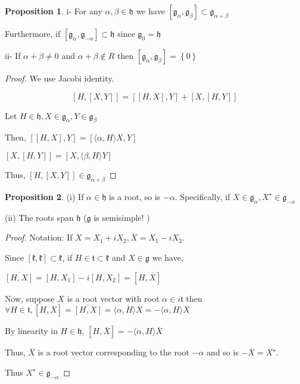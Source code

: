 \documentclass{article}
\theoremstyle{definition}
\newtheorem{proposition}{Proposition}
\begin{document}
\begin{proposition}
    i- For any \(\alpha ,\beta \in \mathfrak{h} \) we have \([\mathfrak{g}_\alpha , \mathfrak{g}_\beta] \subset \mathfrak{g}_{\alpha + \beta} \) 

    Furthermore, if \([\mathfrak{g}_\alpha ,\mathfrak{g}_{-\alpha }  ] \subset \mathfrak{h} \) since \(\mathfrak{g}_0 = \mathfrak{h}  \)  

    ii- If \(\alpha +\beta \neq 0\) and \(\alpha +\beta \notin R\) then \([\mathfrak{g}_\alpha ,\mathfrak{g}_\beta   ]= \left\{ 0 \right\} \)  

\end{proposition}

\begin{proof}
    We use Jacobi identity.

    \[
        [H,[X,Y]] = [[H,X],Y]+[X,[H,Y]]
    \]

    Let \(H\in \mathfrak{h},X\in \mathfrak{g}_\alpha , Y\in \mathfrak{g}_\beta   \) 

    Then, \([[H,X],Y]= [\langle \alpha ,H \rangle X, Y] \) 

    \([X,[H,Y]]=[X,\langle \beta ,H \rangle Y ]\) 

    Thus, \([H,[X,Y]]\in \mathfrak{g_{\alpha +\beta }} \) 

\end{proof}

\begin{proposition}
    (i) If \(\alpha \in \mathfrak{h} \) is a root, so is \(-\alpha \). Specifically, if \(X\in \mathfrak{g}_{\alpha }, X^{\star} \in \mathfrak{g}_{-\alpha }  \)
    
    (ii) The roots span \(\mathfrak{h} \) (\(\mathfrak{g} \) is semisimple! ) 
    
\end{proposition}

\begin{proof}
    Notation: If \(X=X_1+iX_2,\overline{X}=X_1 -iX_2 \).
    
    Since \([\mathfrak{k},\mathfrak{k}  ]\subset \mathfrak{k} \), if \(H\in \mathfrak{t} \subset \mathfrak{k}  \) and \(X\in \mathfrak{g} \) we have,
    
    \(\overline{[H,X]} = [H,X_1] - i[H,X_2] = [H,\overline{X} ] \) 

    Now, suppose \(X\) is a root vector with root \(\alpha \in i \mathfrak{t} \) then \(\forall H\in \mathfrak{t}, [H,\overline{X} ] = \overline{[H,X]}=\overline{\langle \alpha , H \rangle X } = -\langle \alpha ,H \rangle \overline{X}  \) 

    By linearity in \(H\in \mathfrak{h} \), \([H,\overline{X} ]=-\langle \alpha ,H \rangle \overline{X}  \)  

    Thus, \(\overline{X}\) is a root vector corresponding to the root \(-\alpha\) and so is \(-\overline{X}=X^{\star}\).
    
    Thus \(X^{\star} \in \mathfrak{g}_{-\alpha} \) 

\end{proof}
\end{document}
